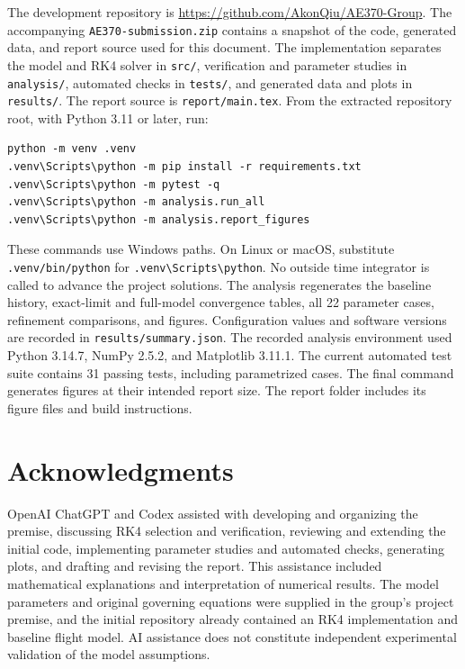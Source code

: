 \documentclass[conf]{new-aiaa}
\begin{document}
The development repository is
\url{https://github.com/AkonQiu/AE370-Group}.
The accompanying \texttt{AE370-submission.zip} contains a snapshot of the
code, generated data, and report source used for this document.
The implementation separates the model and RK4 solver in \texttt{src/},
verification and parameter studies in \texttt{analysis/}, automated checks in
\texttt{tests/}, and generated data and plots in \texttt{results/}.
The report source is \texttt{report/main.tex}. From the extracted repository
root, with Python 3.11 or later, run:
\begin{verbatim}
python -m venv .venv
.venv\Scripts\python -m pip install -r requirements.txt
.venv\Scripts\python -m pytest -q
.venv\Scripts\python -m analysis.run_all
.venv\Scripts\python -m analysis.report_figures
\end{verbatim}
These commands use Windows paths. On Linux or macOS, substitute
\texttt{.venv/bin/python} for \texttt{.venv\textbackslash Scripts\textbackslash python}.
No outside time integrator is called to advance the project solutions.
The analysis regenerates the baseline history, exact-limit and full-model
convergence tables, all 22 parameter cases, refinement comparisons, and figures.
Configuration values and software versions are recorded in
\texttt{results/summary.json}. The recorded analysis environment used
Python 3.14.7, NumPy 2.5.2, and Matplotlib 3.11.1. The current automated test
suite contains 31 passing tests, including parametrized cases.
The final command generates figures at their intended report size.
The report folder includes its figure files and build instructions.

\section*{Acknowledgments}

OpenAI ChatGPT and Codex assisted with developing and organizing the premise,
discussing RK4 selection and verification, reviewing and extending the initial
code, implementing parameter studies and automated checks, generating plots,
and drafting and revising the report. This assistance included mathematical
explanations and interpretation of numerical results. The model parameters
and original governing equations were supplied in the group's project premise,
and the initial repository already contained an RK4 implementation and baseline
flight model. AI assistance does not constitute independent experimental
validation of the model assumptions.
\end{document}
